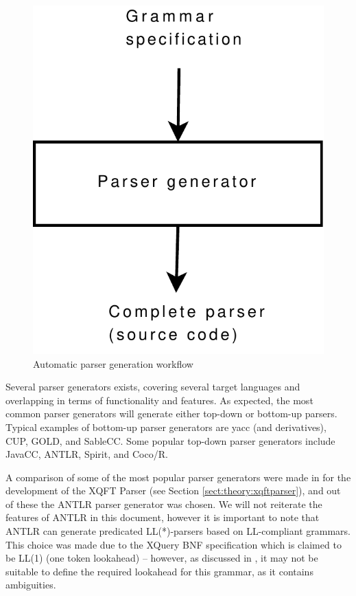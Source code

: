 \begin{figure}[h]
  \centering
    \includegraphics[scale=0.40]{diagrams/parser_generator}
  \caption{Automatic parser generation workflow}
  \label{figure:parser:generator}
\end{figure}

Several parser generators exists, covering several target languages and
overlapping in terms of functionality and features. As expected, the most
common parser generators will generate either top-down or bottom-up parsers. Typical examples of bottom-up parser
generators are yacc (and derivatives), CUP, GOLD, and SableCC. Some popular
top-down parser generators include JavaCC, ANTLR, Spirit, and Coco/R.

A comparison of some of the most popular parser generators were made in
\cite{ourselves} for the development of the XQFT Parser (see Section \ref{sect:theory:xqftparser}), and out of
these the ANTLR parser generator was chosen. We will not reiterate the features of ANTLR in this document, however
it is important to note that ANTLR can generate predicated LL(*)-parsers\cite{definitiveAntlr} based on
LL-compliant grammars. This choice was made due to the XQuery BNF specification
which is claimed to be LL(1) (one token lookahead) -- however, as discussed in
\cite{ourselves}, it may not be suitable to define the required lookahead for this grammar, as it contains
ambiguities.

